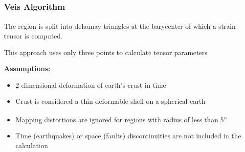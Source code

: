 \begin{frame}
  \frametitle{Veis Algorithm}
  \framesubtitle{\citep{Veis1992}}
  \label{ch2:}
  
  The region is split into delaunay triangles at the barycenter of which a strain tensor is computed.
  
  This approach uses only three points to calculate tensor parameters
  
  \textbf{Assumptions:}
  \begin{itemize}
    \item 2-dimensional deformation of earth's crust in time
    \item Crust is considered a thin deformable shell on a spherical earth
    \item Mapping distortions are ignored for regions with radius of less than 5\textsuperscript{o}
    \item Time (earthquakes) or space (faults) discontinuities are not included in the calculation
  \end{itemize}
\end{frame}
\note{}

\note{}



